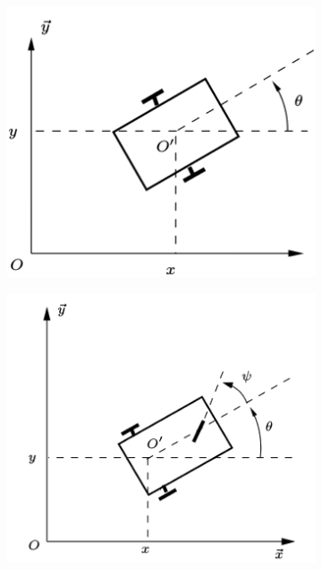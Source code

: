                 \begin{figure}[!h]
                    \centering
                    \begin{subfigure}{0.225\linewidth}
                    \includegraphics[width=\linewidth]{Figures/Bayle-type_de_roue-a}
                    \label{fig:bot_roue-a}
                    \end{subfigure}
                    \begin{subfigure}{0.225\linewidth}
                    \includegraphics[width=\linewidth]{Figures/Bayle-type_de_roue-b}

\end{subfigure}
\end{figure}
